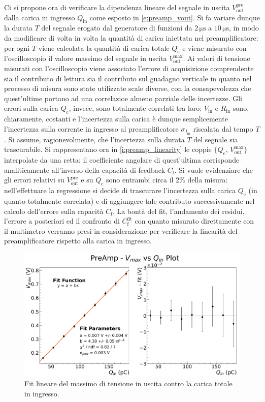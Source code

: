 \documentclass[a4paper,11pt]{article} %
\begin{document}
Ci si propone ora di verificare la dipendenza lineare del segnale in uscita $V^{\text{pre}}_{\text{out}}$ dalla carica
in ingresso $Q_{\text{in}}$ come esposto in \autoref{e:preamp_vout}. Si fa variare dunque la durata $T$ del segnale
erogato dal generatore di funzioni da $2\,\si{\us}$ a $10\,\si{\us}$, in modo da modificare di volta in volta la
quantità di carica iniettata nel preamplificatore: per ogni $T$ viene calcolata la quantità di carica totale
$Q_{\text{c}}$ e viene misurato con l'oscilloscopio il valore massimo del segnale in uscita
$V^{\text{max}}_{\text{out}}$.  Ai valori di tensione misurati con l'oscilloscopio viene associato l'errore di
acquisizione comprendente sia il contributo di lettura sia il contributo sul guadagno verticale in quanto nel processo
di misura sono state utilizzate scale diverse, con la consapevolezza che quest'ultime portano ad una correlazioe almeno
parziale delle incertezze. Gli errori sulla carica $Q_{\text{c}}$, invece, sono totalmente correlati tra loro:
$V_{\text{in}}$ e $R_{\text{in}}$ sono, chiaramente, costanti e l'incertezza sulla carica è dunque semplicemente
l'incertezza sulla corrente in ingresso al preamplificatore $\sigma_{I_{\text{in}}}$ riscalata dal tempo $T$. Si assume,
ragionevolmente, che l'incertezza sulla durata $T$ del segnale sia trascurabile. Si rappresentano ora in
\autoref{i:preamp_linearity} le coppie $\{Q_{\text{c}},\,V^{\text{max}}_{\text{out}}\}$ interpolate da una retta: il
coefficiente angolare di quest'ultima corrisponde analiticamente all'inverso della capacità di feedback $C_{\text{f}}$.
Si vuole evidenziare che gli errori relativi su $V^{\text{pre}}_{\text{out}}$ e su $Q_{\text{c}}$ sono entrambi circa il
$2\%$ della misura: nell'effettuare la regressione si decide di trascurare l'incertezza sulla carica $Q_{\text{c}}$ (in
quanto totalmente correlata) e di aggiungere tale contributo successivamente nel calcolo dell'errore sulla capacità
$C_{\text{f}}$. La bontà del fit, l'andamento dei residui, l'errore a posteriori ed il confronto di
$C_{\text{f}}^{\text{fit}}$ con quanto misurato direttamente con il multimetro verranno presi in considerazione per
verificare la linearità del preamplificatore rispetto alla carica in ingresso.
\begin{figure}[H]
	\centering
	\includegraphics[width=0.9\linewidth]{../Plots/PreAmp/Vmax_Qin_lin_fit.png}
	\caption{\small Fit lineare del massimo di tensione in uscita contro la carica totale in ingresso.}
	\label{i:preamp_linearity}
\end{figure}
\end{document}
